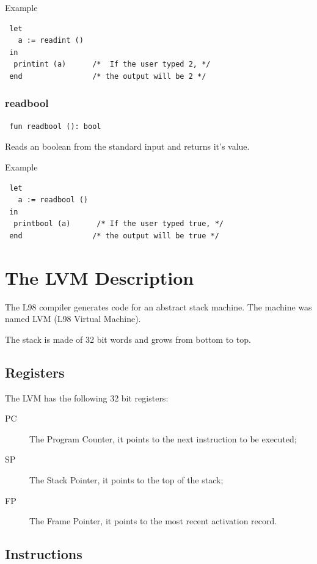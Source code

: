 \documentclass[a4paper, 11pt]{report}
\begin{document}
Example
\begin{verbatim}
 let
   a := readint ()
 in
  printint (a)      /*  If the user typed 2, */
 end                /* the output will be 2 */
\end{verbatim}


\subsection{readbool}

\begin{verbatim}
 fun readbool (): bool
\end{verbatim}
Reads an boolean from the standard input and returns it's value.


Example
\begin{verbatim}
 let
   a := readbool ()
 in
  printbool (a)      /* If the user typed true, */
 end                /* the output will be true */
\end{verbatim}

\chapter{The LVM Description}

The L98 compiler generates code for an abstract stack machine. The machine
was named LVM (L98 Virtual Machine).

The stack is made of 32 bit words and grows from bottom to top.

\section{Registers}
The LVM has the following 32 bit registers:

\begin{description}
\item[PC] The Program Counter, it points to the next instruction to be executed;

\item[SP] The Stack Pointer, it points to the top of the stack;

\item[FP] The Frame Pointer, it points to the most recent activation record.
\end{description}

\section{Instructions}
\end{document}
